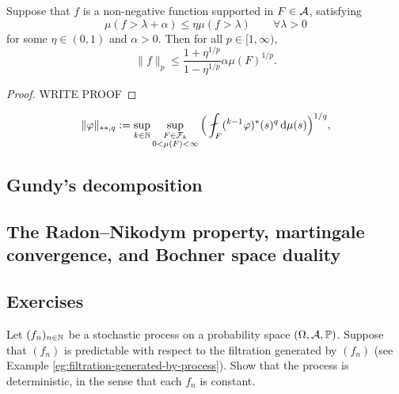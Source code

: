 \begin{lem}
  Suppose that $f$ is a non-negative function supported in $F \in \mathcal{A}$, satisfying
  \begin{equation*}
    \mu(f > \lambda + \alpha) \leq \eta \mu(f > \lambda) \qquad \forall \lambda > 0
  \end{equation*}
  for some $\eta \in (0,1)$ and $\alpha > 0$.
  Then for all $p \in [1,\infty)$,
  \begin{equation*}
    \|f\|_p \leq \frac{1 + \eta^{1/p}}{1 - \eta^{1/p}} \alpha \mu(F)^{1/p}.
  \end{equation*}
\end{lem}

\begin{proof}
  {\color{red} WRITE PROOF}
\end{proof}


{\color{blue}

\begin{equation*}
  \|\phi\|_{**,q} := \sup_{k \in \N} \sup_{\substack{F \in \mc{F}_k \\ 0 < \mu(F) < \infty}} \Big( \fint_{F} ({}^{k-1} \phi)^{*}(s)^q \, \dd\mu(s) \Big)^{1/q},
\end{equation*}

}



\subsection{Gundy's decomposition}

\subsection{The Radon--Nikodym property, martingale convergence, and Bochner space duality}

\subsection*{Exercises}

\begin{exercise}
  Let $(f_n)_{n \in \mathbb{N}}$ be a stochastic process on a probability space $(\Omega,\mathcal{A},\mathbb{P})$.
  Suppose that $(f_n)$ is predictable with respect to the filtration generated by $(f_n)$ (see Example \ref{eg:filtration-generated-by-process}).
  Show that the process is deterministic, in the sense that each $f_n$ is constant.
\end{exercise}

